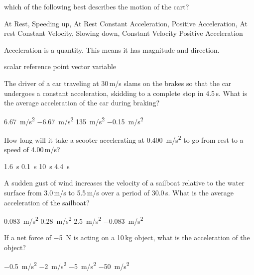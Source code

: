 \documentclass[]{exam}
\begin{document}
\begin{questions}
which of the following best describes the motion of the cart?

\begin{randomizechoices}
    \choice At Rest, Speeding up, At Rest
    \choice Constant Acceleration, Positive Acceleration, At rest
    \correctchoice Constant Velocity, Slowing down, Constant Velocity
    \choice Positive Acceleration
\end{randomizechoices}

\question
Acceleration is a \fillin[vector][3cm] quantity.  This means it has magnitude and direction.

\begin{randomizechoices}
    \choice scalar
    \choice reference point
    \correctchoice vector
    \choice variable
\end{randomizechoices}

\question
The driver of a car traveling at 30\,m/s slams on the brakes so that the car undergoes a constant acceleration, skidding to a complete stop in 4.5\,s. What is the average acceleration of the car during braking?

\begin{randomizechoices}
    \choice \SI{6.67}{m/s^2}
    \correctchoice \SI{-6.67}{m/s^2}
    \choice \SI{135}{m/s^2}
    \choice \SI{-0.15}{m/s^2}
\end{randomizechoices}

\question
How long will it take a scooter accelerating at \SI{0.400}{m/s^2} to go from rest to a speed of 4.00\,m/s?

\begin{randomizechoices}
    \choice \SI{1.6}{s}
    \choice \SI{0.1}{s}
    \correctchoice \SI{10}{s}
    \choice \SI{4.4}{s}
\end{randomizechoices}

\question
A sudden gust of wind increases the velocity of a sailboat relative to the water surface from 3.0\,m/s to 5.5\,m/s over a period of 30.0\,s. What is the average acceleration of the sailboat?

\begin{randomizechoices}
    \correctchoice \SI{0.083}{m/s^2}
    \choice \SI{0.28}{m/s^2}
    \choice \SI{2.5}{m/s^2}
    \choice \SI{-0.083}{m/s^2}
\end{randomizechoices}


\question
If a net force of \SI{-5}{N} is acting on a 10\,kg object, what is the acceleration of the object?

\begin{randomizechoices}
    \correctchoice \SI{-0.5}{m/s^2}
    \choice \SI{-2}{m/s^2}
    \choice \SI{-5}{m/s^2}
    \choice \SI{-50}{m/s^2}
\end{randomizechoices}


\end{questions}
\end{document}
